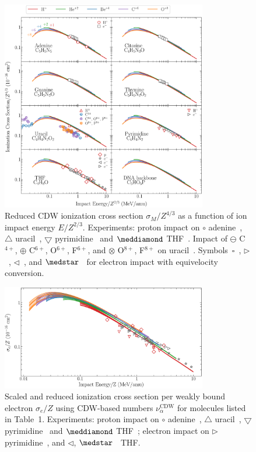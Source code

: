 \documentclass[10pt,showpacs,twocolumn]{revtex4}
\begin{document}
\newpage
\begin{figure}[]
\centering
\includegraphics[width=0.8\textwidth]{figuras/DBzscale.eps}
\caption{Reduced CDW ionization cross section $\sigma_{M}/Z^{4/3}$ as a function 
of ion impact energy $E/Z^{2/3}$. 
Experiments: 
proton impact on 
\mbox{\Large$\circ$} adenine~\cite{iriki2011},
$\triangle$ uracil~\cite{itoh2013}, 
$\bigtriangledown$ pyrimidine~\cite{wolff2014} and 
$\meddiamond$ THF~\cite{wang2016}.
Impact of $\ominus$ C$^{4+}$, 
$\oplus$ C$^{6+}$, O$^{6+}$, F$^{6+}$, and
$\otimes$ O$^{8+}$, F$^{8+}$ on 
uracil~\cite{agnihotri2012,agnihotri2013}. 
Symbols~$\square$~\cite{rahman2016}, $\rhd$~\cite{bug2017}, 
$\lhd$~\cite{wolf2019}, and $\medstar$~\cite{fuss2009} for electron 
impact with equivelocity conversion.}
\label{fig:z3reduced}
\end{figure} 

\begin{figure}[]
\centering
\includegraphics[width=0.8\textwidth]{figuras/zmol85.eps}
\caption{Scaled and reduced ionization cross section per weakly bound 
electron $\sigma_e/Z$ using CDW-based numbers $\nu_{\alpha}^{\text{CDW}}$ 
for molecules listed in Table~1.
Experiments: proton impact on 
\mbox{\Large$\circ$} adenine~\cite{iriki2011}, 
$\triangle$ uracil~\cite{itoh2013}, 
$\bigtriangledown$ pyrimidine~\cite{wolff2014} and $\meddiamond$ 
THF~\cite{wang2016}; electron impact on $\rhd$ pyrimidine~\cite{bug2017},
and $\lhd$, $\medstar$~\cite{wolf2019,fuss2009} THF.}
\label{fig:zredscaled}
\end{figure}
\end{document}
